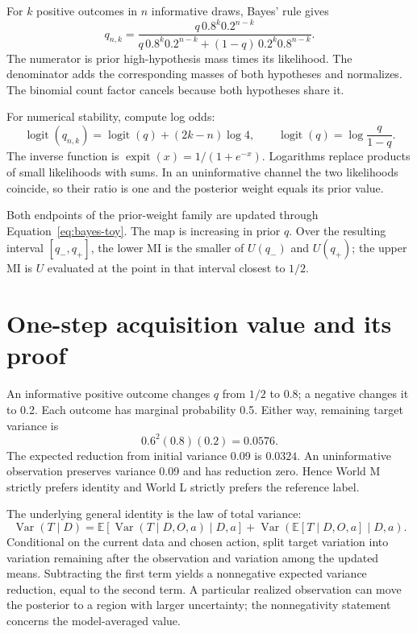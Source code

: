 \documentclass[11pt,a4paper]{report}
\newcommand{\E}{\mathbb E}
\newcommand{\Var}{\operatorname{Var}}
\begin{document}
For $k$ positive outcomes in $n$ informative draws, Bayes' rule gives
\begin{equation}
q_{n,k}=\frac{q\,0.8^k0.2^{n-k}}
{q\,0.8^k0.2^{n-k}+(1-q)\,0.2^k0.8^{n-k}}.
\label{eq:bayes-toy}
\end{equation}
The numerator is prior high-hypothesis mass times its likelihood. The denominator adds the corresponding masses of both hypotheses and normalizes. The binomial count factor cancels because both hypotheses share it.

For numerical stability, compute log odds:
\begin{equation}
\operatorname{logit}(q_{n,k})=\operatorname{logit}(q)+(2k-n)\log4,
\qquad \operatorname{logit}(q)=\log\frac q{1-q}.
\end{equation}
The inverse function is $\operatorname{expit}(x)=1/(1+e^{-x})$. Logarithms replace products of small likelihoods with sums. In an uninformative channel the two likelihoods coincide, so their ratio is one and the posterior weight equals its prior value.

Both endpoints of the prior-weight family are updated through Equation~\eqref{eq:bayes-toy}. The map is increasing in prior $q$. Over the resulting interval $[q_-,q_+]$, the lower MI is the smaller of $U(q_-)$ and $U(q_+)$; the upper MI is $U$ evaluated at the point in that interval closest to $1/2$.

\section{One-step acquisition value and its proof}
An informative positive outcome changes $q$ from $1/2$ to 0.8; a negative changes it to 0.2. Each outcome has marginal probability 0.5. Either way, remaining target variance is
\begin{equation}
0.6^2(0.8)(0.2)=0.0576.
\end{equation}
The expected reduction from initial variance 0.09 is $0.0324$. An uninformative observation preserves variance 0.09 and has reduction zero. Hence World M strictly prefers identity and World L strictly prefers the reference label.

The underlying general identity is the law of total variance:
\begin{equation}
\Var(T\mid D)=\E[\Var(T\mid D,O,a)\mid D,a]
+\Var(\E[T\mid D,O,a]\mid D,a).
\label{eq:totalvar}
\end{equation}
Conditional on the current data and chosen action, split target variation into variation remaining after the observation and variation among the updated means. Subtracting the first term yields a nonnegative expected variance reduction, equal to the second term. A particular realized observation can move the posterior to a region with larger uncertainty; the nonnegativity statement concerns the model-averaged value.
\end{document}
